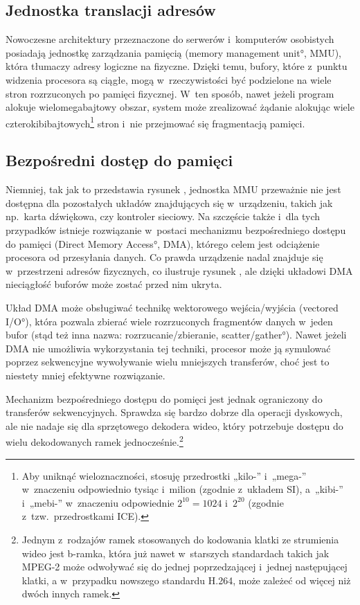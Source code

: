 \subsection{Jednostka translacji adresów}

Nowoczesne architektury przeznaczone do serwerów i~komputerów
osobistych posiadają jednostkę zarządzania pamięcią (\ang{memory
  management unit}, MMU), która tłumaczy adresy logiczne na
fizyczne.  Dzięki temu, bufory, które z~punktu widzenia procesora są
ciągłe, mogą w~rzeczywistości być podzielone na wiele stron
rozrzuconych po pamięci fizycznej.  W~ten sposób, nawet jeżeli program
alokuje wielomegabajtowy obszar, system może zrealizować żądanie
alokując wiele czterokibibajtowych\footnote{Aby uniknąć
  wieloznaczności, stosuję przedrostki „kilo-” i~„mega-” w~znaczeniu
  odpowiednio tysiąc i~milion (zgodnie z~układem SI), a~„kibi-”
  i~„mebi-” w~znaczeniu odpowiednie $2^{10} = 1024$ i~$2^{20}$
  (zgodnie z~tzw.\ przedrostkami ICE).} stron i~nie przejmować się
fragmentacją pamięci.

\subsection{Bezpośredni dostęp do pamięci}

Niemniej, tak jak to przedstawia rysunek ,
jednostka MMU przeważnie nie jest dostępna dla pozostałych układów
znajdujących się w~urządzeniu, takich jak np.\ karta dźwiękowa, czy
kontroler sieciowy.  Na szczęście także i~dla tych przypadków istnieje
rozwiązanie w~postaci mechanizmu bezpośredniego dostępu do pamięci
(\ang{Direct Memory Access}, DMA), którego celem jest odciążenie
procesora od przesyłania danych.  Co prawda urządzenie nadal znajduje
się w~przestrzeni adresów fizycznych, co ilustruje rysunek
, ale dzięki układowi DMA nieciągłość
buforów może zostać przed nim ukryta.

Układ DMA może obsługiwać technikę wektorowego wejścia/wyjścia
(\ang{vectored I/O}), która pozwala zbierać wiele rozrzuconych
fragmentów danych w~jeden bufor (stąd też inna nazwa:
rozrzucanie/zbieranie, \ang{scatter/gather}).  Nawet jeżeli DMA nie
umożliwia wykorzystania tej techniki, procesor może ją symulować
poprzez sekwencyjne wywoływanie wielu mniejszych transferów, choć jest
to niestety mniej efektywne rozwiązanie.

Mechanizm bezpośredniego dostępu do pomięci jest jednak ograniczony do
transferów sekwencyjnych.  Sprawdza się bardzo dobrze dla operacji
dyskowych, ale nie nadaje się dla sprzętowego dekodera wideo, który
potrzebuje dostępu do wielu dekodowanych ramek
jednocześnie.\footnote{Jednym z~rodzajów ramek stosowanych do
  kodowania klatki ze strumienia wideo jest b-ramka, która już nawet
  w~starszych standardach takich jak MPEG-2 może odwoływać się do
  jednej poprzedzającej i~jednej następującej klatki, a w~przypadku
  nowszego standardu H.264, może zależeć od więcej niż dwóch innych
  ramek.}

